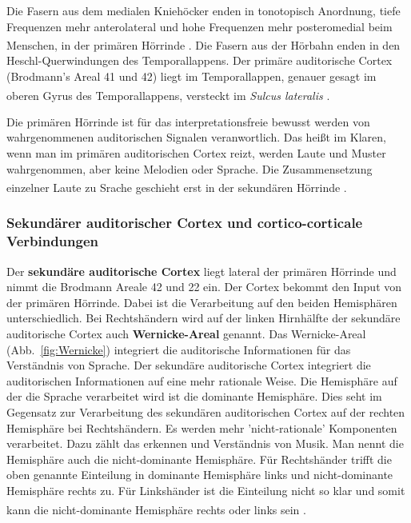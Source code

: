 \documentclass[12pt,a4paper,pdftex]{article}
\begin{document}
Die Fasern aus dem medialen Kniehöcker enden in tonotopisch Anordnung, tiefe Frequenzen mehr anterolateral und hohe Frequenzen mehr posteromedial beim Menschen, in der primären Hörrinde \textsuperscript{\cite[9.9]{trepel2011neuroanatomie}}. Die Fasern aus der Hörbahn enden in den Heschl-Querwindungen des Temporallappens. Der primäre auditorische Cortex (Brodmann's Areal 41 und 42) liegt im Temporallappen, genauer gesagt im oberen Gyrus des Temporallappens, versteckt im \textit{Sulcus lateralis}  \textsuperscript{\cite[13]{crossman2014neuroanatomy}}. 

Die primären Hörrinde ist für das interpretationsfreie bewusst werden von wahrgenommenen auditorischen Signalen veranwortlich. Das heißt im Klaren, wenn man im primären auditorischen Cortex reizt, werden Laute und Muster wahrgenommen, aber keine Melodien oder Sprache. Die Zusammensetzung einzelner Laute zu Srache geschieht erst in der sekundären Hörrinde \textsuperscript{\cite[9.9]{trepel2011neuroanatomie}}.

\subsubsection*{Sekundärer auditorischer Cortex und cortico-corticale Verbindungen}

Der \textbf{sekundäre auditorische Cortex}  liegt lateral der primären Hörrinde und nimmt die Brodmann Areale 42 und 22 ein. Der Cortex bekommt den Input von der primären Hörrinde. Dabei ist die Verarbeitung auf den beiden Hemisphären unterschiedlich. Bei Rechtshändern wird auf der linken Hirnhälfte der sekundäre auditorische Cortex auch \textbf{Wernicke-Areal}  genannt. Das Wernicke-Areal (Abb.~\ref{fig:Wernicke}) integriert die auditorische Informationen für das Verständnis von Sprache. Der sekundäre auditorische Cortex integriert die auditorischen Informationen auf eine mehr rationale Weise. Die Hemisphäre auf der die Sprache verarbeitet wird ist die dominante Hemisphäre. Dies seht im Gegensatz zur Verarbeitung des sekundären auditorischen Cortex auf der rechten Hemisphäre bei Rechtshändern. Es werden mehr 'nicht-rationale' Komponenten verarbeitet. Dazu zählt das erkennen und Verständnis von Musik. Man nennt die Hemisphäre auch die nicht-dominante Hemisphäre. Für Rechtshänder trifft die oben genannte Einteilung in dominante Hemisphäre links und nicht-dominante Hemisphäre rechts zu. Für Linkshänder ist die Einteilung nicht so klar und somit kann die nicht-dominante Hemisphäre rechts oder links sein \textsuperscript{\cite{trepel2011neuroanatomie}}.
\end{document}
